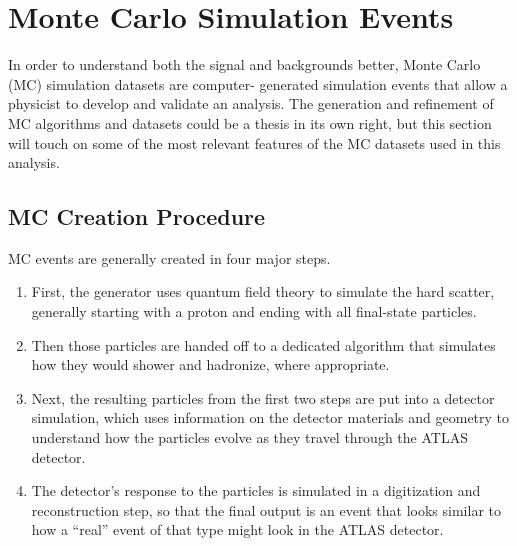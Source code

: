  

\chapter[Monte Carlo Simulation]{Monte Carlo Simulation Events}

In order to understand both the signal and backgrounds better, Monte Carlo (MC) simulation datasets are computer-
generated simulation events that allow a physicist to develop and validate an analysis.  The generation and refinement of MC 
algorithms and datasets could be a thesis in its own right, but this section will touch on some of 
the most relevant features of the MC datasets used in this analysis.


\section{MC Creation Procedure}
\label{sec:mc-gen-overview}
MC events are generally created in four major steps.  
\begin{enumerate}
    \item First, the generator uses quantum field theory to simulate the hard 
    scatter, generally starting with a proton and ending with all final-state particles.  
    \item Then those particles are handed off to a dedicated algorithm that simulates 
    how they would shower and hadronize, where appropriate.  
    \item Next, the resulting particles from the first two steps are put 
    into a detector simulation, which uses information on the detector materials and geometry 
    to understand how the particles evolve as they travel through the ATLAS detector.  
    \item The detector's response to the particles is simulated in a 
    digitization and reconstruction step, so that the final output is an event that 
    looks similar to how a ``real'' event of that type might look in the ATLAS detector. 
\end{enumerate} 

